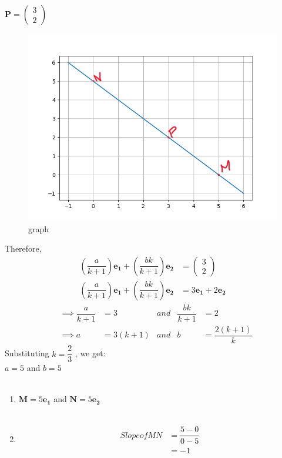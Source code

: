 \documentclass[journal,12pt,twocolumn]{IEEEtran}
\theoremstyle{remark}
\newcommand{\myvec}[1]{\ensuremath{\begin{pmatrix}#1\end{pmatrix}}}
\numberwithin{equation}{subsection}
\let\vec\mathbf
\begin{document}
 $ \vec{P} = \myvec{3 \\ 2}$\\
\begin{figure}
\centering  
\includegraphics[width=\columnwidth]{figures/Figure_1.png}
\caption{graph}
\label{graph} 
\end{figure}
Therefore,
\begin{align}
 \left( \dfrac{a}{k+1}\right) \vec{e_1}+\left( \dfrac{bk}{k+1}\right) \vec{e_2} &= \myvec{3 \\ 2}\\
 \left( \dfrac{a}{k+1}\right) \vec{e_1}+\left( \dfrac{bk}{k+1}\right) \vec{e_2} &= 3\vec{e_1}+2\vec{e_2}
\end{align}
\begin{align}
  &\implies \dfrac{a}{k+1} &= 3 &and &\dfrac{bk}{k+1} &= 2 \\
  &\implies a &= 3(k+1)  &and &b &= \dfrac{2(k+1)}{k}
\end{align}   
Substituting $k = \dfrac{2}{3}$ , we get:\\
   $a = 5$ and $b = 5$\\\\
\begin{enumerate}
\item$\vec{M} = 5\vec{e_1}$ and $\vec{N} = 5\vec{e_2}$\\\\
\item \begin{align}
      Slope of MN &= \dfrac{5-0}{0-5}\\
                  &= -1
      \end{align}
\end{enumerate}                  
\end{document}
